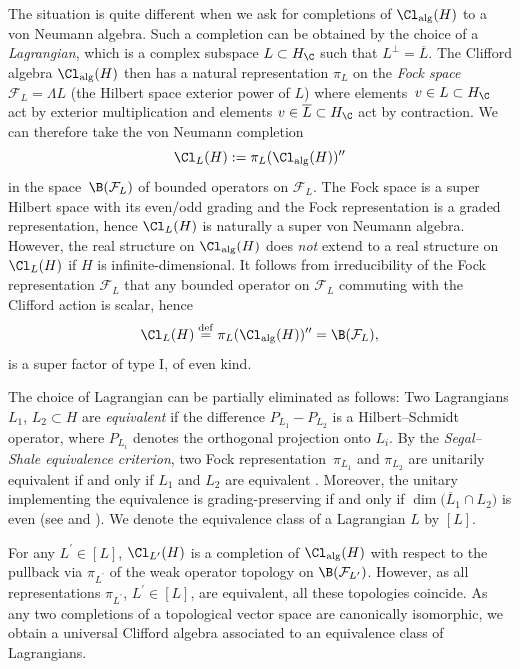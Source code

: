 The situation is quite different when we ask for completions of $\Cl_{\mathrm{alg}}(H)$ to a von Neumann algebra.
Such a completion can be obtained by the choice of a \emph{Lagrangian}, which is a complex subspace $L \subset H_\C$ such that $L^\perp = \overline{L}$.
The Clifford algebra $\Cl_{\mathrm{alg}}(H)$ then has a natural representation $\pi_L$ on the \emph{Fock space} $\mathcal{F}_L = \Lambda L$ (the Hilbert space exterior power of $L$) where elements~$v \in L \subset H_\C$ act by exterior multiplication and elements $v \in \overline{L} \subset H_\C$ act by contraction. We can therefore take the von Neumann completion
\[\Cl_L(H) := \pi_L(\Cl_{\mathrm{alg}}(H))^{\prime\prime}\]
 in the space~$\B(\mathcal{F}_L)$ of bounded operators on $\mathcal{F}_L$.
The Fock space is a super Hilbert space with its even/odd grading and the Fock representation is a graded representation, hence $\Cl_L(H)$ is naturally a super von Neumann algebra.
However, the real structure on $\Cl_{\mathrm{alg}}(H)$ does \emph{not} extend to a real structure on $\Cl_L(H)$ if $H$ is infinite-dimensional. It follows from irreducibility of the Fock representation $\mathcal{F}_L$ \cite[Theorem~2.4.2]{PlymenRobinson} that any bounded operator on $\mathcal{F}_L$ commuting with the Clifford action is scalar, hence
\begin{equation}
\label{IdentificationWithBH}
 \Cl_L(H)  \stackrel{\mathrm{def}}{=}  \pi_L(\Cl_{\mathrm{alg}}(H))^{\prime\prime} = \B(\mathcal{F}_L),
\end{equation}
is a super factor of type I, of even kind.

The choice of Lagrangian can be partially eliminated as follows:
Two Lagrangians $L_1$, $L_2 \subset H$ are \emph{equivalent} if the difference $P_{L_1} - P_{L_2}$ is a Hilbert--Schmidt operator, where $P_{L_i}$ denotes the orthogonal projection onto $L_i$.
By the \emph{Segal--Shale equivalence criterion}, two Fock representation~$\pi_{L_1}$ and $\pi_{L_2}$ are unitarily equivalent if and only if $L_1$ and $L_2$ are equivalent \cite[Theorem~3.4.1]{PlymenRobinson}.
Moreover, the unitary implementing the equivalence is grading-preserving if and only if $\dim\big(\overline{L}_1 \cap L_2\big)$ is even (see \cite[Theorem~1.22]{PratWaldron} and \cite[Theorem~3.5.1]{PlymenRobinson}).
We denote the equivalence class of a Lagrangian $L$ by $[L]$.

For any $L^\prime \in [L]$, $\Cl_{L^\prime}(H)$ is a completion of $\Cl_{\mathrm{alg}}(H)$ with respect to the pullback via $\pi_{L^\prime}$ of the weak operator topology on $\B(\mathcal{F}_{L^\prime})$.
However, as all representations $\pi_{L^\prime}$, $L^\prime \in [L]$, are equivalent, all these topologies coincide. As any two completions of a topological vector space are canonically isomorphic, we obtain a universal Clifford algebra associated to an equivalence class of Lagrangians.


